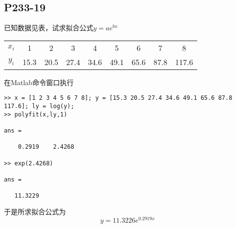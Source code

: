 \subsection{P233-19}
已知数据见表，试求拟合公式$y=a e^{b x}$
\begin{center}
\begin{tabular}{c|c c c c c c c c}
$x_i$ & 1    & 2    & 3    & 4    & 5    & 6    & 7    & 8 \\
$y_i$ & 15.3 & 20.5 & 27.4 & 34.6 & 49.1 & 65.6 & 87.8 & 117.6
\end{tabular}
\end{center}
\begin{SOLVE}
在Matlab命令窗口执行
\begin{lstlisting}
>> x = [1 2 3 4 5 6 7 8]; y = [15.3 20.5 27.4 34.6 49.1 65.6 87.8 117.6]; ly = log(y);
>> polyfit(x,ly,1)

ans =

    0.2919    2.4268

>> exp(2.4268)

ans =

   11.3229
\end{lstlisting}
于是所求拟合公式为
\begin{displaymath}
y = 11.3226 e^{0.2919 x}
\end{displaymath}
\end{SOLVE}